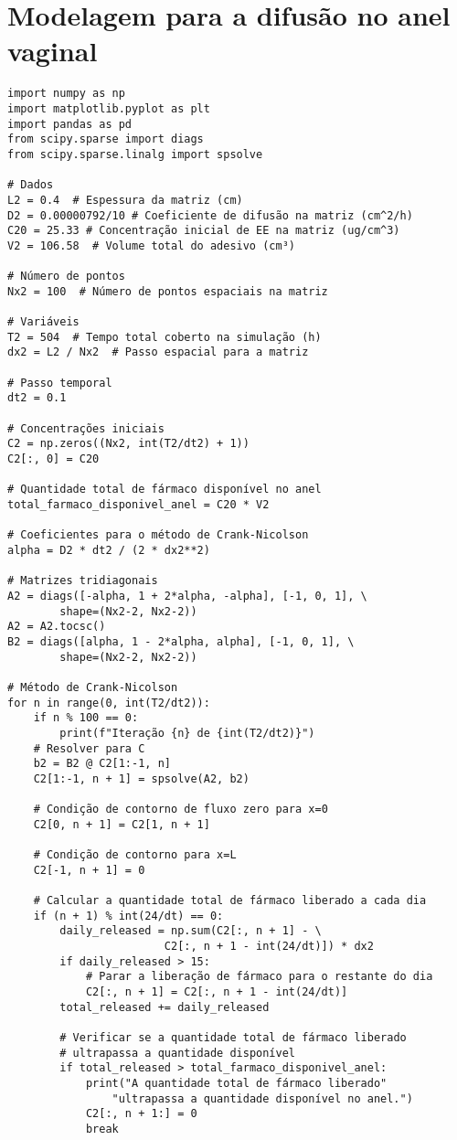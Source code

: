 \section{Modelagem para a difusão no anel vaginal}
\begin{verbatim}
import numpy as np
import matplotlib.pyplot as plt
import pandas as pd
from scipy.sparse import diags
from scipy.sparse.linalg import spsolve

# Dados
L2 = 0.4  # Espessura da matriz (cm)
D2 = 0.00000792/10 # Coeficiente de difusão na matriz (cm^2/h)
C20 = 25.33 # Concentração inicial de EE na matriz (ug/cm^3)
V2 = 106.58  # Volume total do adesivo (cm³)

# Número de pontos
Nx2 = 100  # Número de pontos espaciais na matriz

# Variáveis
T2 = 504  # Tempo total coberto na simulação (h)
dx2 = L2 / Nx2  # Passo espacial para a matriz

# Passo temporal
dt2 = 0.1

# Concentrações iniciais
C2 = np.zeros((Nx2, int(T2/dt2) + 1))
C2[:, 0] = C20

# Quantidade total de fármaco disponível no anel
total_farmaco_disponivel_anel = C20 * V2

# Coeficientes para o método de Crank-Nicolson
alpha = D2 * dt2 / (2 * dx2**2)

# Matrizes tridiagonais
A2 = diags([-alpha, 1 + 2*alpha, -alpha], [-1, 0, 1], \
        shape=(Nx2-2, Nx2-2))
A2 = A2.tocsc()
B2 = diags([alpha, 1 - 2*alpha, alpha], [-1, 0, 1], \
        shape=(Nx2-2, Nx2-2))

# Método de Crank-Nicolson
for n in range(0, int(T2/dt2)):
    if n % 100 == 0:
        print(f"Iteração {n} de {int(T2/dt2)}")
    # Resolver para C
    b2 = B2 @ C2[1:-1, n]
    C2[1:-1, n + 1] = spsolve(A2, b2)

    # Condição de contorno de fluxo zero para x=0
    C2[0, n + 1] = C2[1, n + 1]

    # Condição de contorno para x=L
    C2[-1, n + 1] = 0

    # Calcular a quantidade total de fármaco liberado a cada dia
    if (n + 1) % int(24/dt) == 0:
        daily_released = np.sum(C2[:, n + 1] - \
                        C2[:, n + 1 - int(24/dt)]) * dx2
        if daily_released > 15:
            # Parar a liberação de fármaco para o restante do dia
            C2[:, n + 1] = C2[:, n + 1 - int(24/dt)]
        total_released += daily_released

        # Verificar se a quantidade total de fármaco liberado 
        # ultrapassa a quantidade disponível
        if total_released > total_farmaco_disponivel_anel:
            print("A quantidade total de fármaco liberado" 
                "ultrapassa a quantidade disponível no anel.")
            C2[:, n + 1:] = 0
            break


\end{verbatim}
